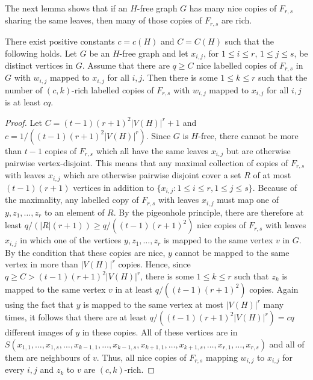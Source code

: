 The next lemma shows that if an $H$-free graph $G$ has many nice copies of $F_{r,s}$ sharing the same leaves, then many of those copies of $F_{r,s}$ are rich.

\begin{lemma} \label{lem:rich with fixed leaves}
	There exist positive constants $c=c(H)$ and $C=C(H)$ such that the following holds. Let $G$ be an $H$-free graph and let $x_{i,j}$, for $1\leq i\leq r$, $1\leq j\leq s$, be distinct vertices in $G$. Assume that there are $q\geq C$ nice labelled copies of $F_{r,s}$ in $G$ with $w_{i,j}$ mapped to $x_{i,j}$ for all $i,j$. Then there is some $1\leq k\leq r$ such that the number of $(c,k)$-rich labelled copies of $F_{r,s}$ with $w_{i,j}$ mapped to $x_{i,j}$ for all $i, j$ is at least $cq$.
\end{lemma}

\begin{proof}
    Let $C=(t-1)(r+1)^2|V(H)|^r+1$ and $c=1/((t-1)(r+1)^2|V(H)|^r)$. Since $G$ is $H$-free, there cannot be more than $t-1$ copies of $F_{r,s}$ which all have the same leaves $x_{i,j}$ but are otherwise pairwise vertex-disjoint. This means that any maximal collection of copies of $F_{r,s}$ with leaves $x_{i,j}$ which are otherwise pairwise disjoint cover a set $R$ of at most $(t-1)(r+1)$ vertices in addition to $\{x_{i,j}:1\leq i\leq r,1\leq j\leq s\}$. Because of the maximality, any labelled copy of $F_{r,s}$ with leaves $x_{i,j}$ must map one of $y,z_1,\dots,z_r$ to an element of $R$. By the pigeonhole principle, there are therefore at least $q/(|R|(r+1))\geq q/((t-1)(r+1)^2)$ nice copies of $F_{r,s}$ with leaves $x_{i,j}$ in which one of the vertices $y,z_1,\dots,z_r$ is mapped to the same vertex $v$ in $G$. By the condition that these copies are nice, $y$ cannot be mapped to the same vertex in more than $|V(H)|^r$ copies. Hence, since $q\geq C>(t-1)(r+1)^2|V(H)|^r$, 
    there is some $1\leq k\leq r$ such that $z_k$ is mapped to the same vertex $v$ in at least $q/((t-1)(r+1)^2)$ copies. Again using the fact that $y$ is mapped to the same vertex at most $|V(H)|^r$ many times, it follows that there are at least $q/((t-1)(r+1)^2|V(H)|^r)=cq$ different images of $y$ in these copies. All of these vertices are in $S(x_{1,1},\dots,x_{1,s},\dots,x_{k-1,1},\dots,x_{k-1,s},x_{k+1,1},\dots,x_{k+1,s},\dots,x_{r,1},\dots,x_{r,s})$ and all of them are neighbours of $v$. Thus, all nice copies of $F_{r,s}$ mapping $w_{i,j}$ to $x_{i,j}$ for every $i,j$ and $z_k$ to $v$ are $(c,k)$-rich.
\end{proof}

